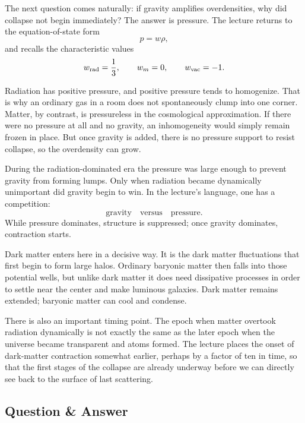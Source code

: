 The next question comes naturally: if gravity amplifies overdensities, why did collapse not begin immediately? The answer is pressure. The lecture returns to the equation-of-state form
\begin{equation}
p=w\rho,
\end{equation}
and recalls the characteristic values
\begin{equation}
w_{\rm rad}=\frac13,
\qquad
w_m=0,
\qquad
w_{\rm vac}=-1.
\end{equation}

Radiation has positive pressure, and positive pressure tends to homogenize. That is why an ordinary gas in a room does not spontaneously clump into one corner. Matter, by contrast, is pressureless in the cosmological approximation. If there were no pressure at all and no gravity, an inhomogeneity would simply remain frozen in place. But once gravity is added, there is no pressure support to resist collapse, so the overdensity can grow.

During the radiation-dominated era the pressure was large enough to prevent gravity from forming lumps. Only when radiation became dynamically unimportant did gravity begin to win. In the lecture's language, one has a competition:
\begin{equation}
\text{gravity} \quad \text{versus} \quad \text{pressure}.
\end{equation}
While pressure dominates, structure is suppressed; once gravity dominates, contraction starts.

Dark matter enters here in a decisive way. It is the dark matter fluctuations that first begin to form large halos. Ordinary baryonic matter then falls into those potential wells, but unlike dark matter it does need dissipative processes in order to settle near the center and make luminous galaxies. Dark matter remains extended; baryonic matter can cool and condense.

There is also an important timing point. The epoch when matter overtook radiation dynamically is not exactly the same as the later epoch when the universe became transparent and atoms formed. The lecture places the onset of dark-matter contraction somewhat earlier, perhaps by a factor of ten in time, so that the first stages of the collapse are already underway before we can directly see back to the surface of last scattering.

\subsection{Question \& Answer}

